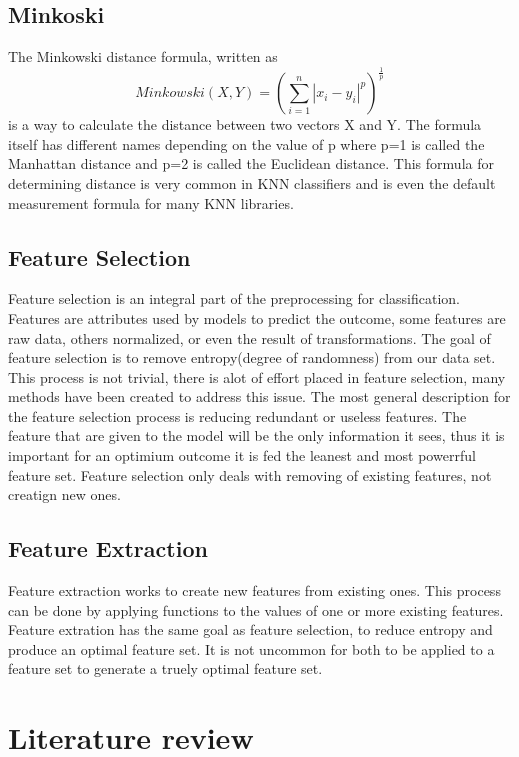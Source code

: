 \documentclass[confrence]{IEEEtran}
\begin{document}
\subsection*{Minkoski}
The Minkowski distance formula, written as \[ Minkowski(X,Y) = (\sum_{i=1}^n|x_i-y_i|^p)^\frac{1}{p}\] is a way to calculate the distance between two vectors X and Y. 
The formula itself has different names depending on the value of p where p=1 is called the Manhattan distance and p=2 is called the Euclidean distance. 
This formula for determining distance is very common in KNN classifiers and is even the default measurement formula for many KNN libraries. 
\subsection*{Feature Selection}
Feature selection is an integral part of the preprocessing for classification. 
Features are attributes used by models to predict the outcome, some features are raw data, others normalized, or even the result of transformations.
The goal of feature selection is to remove entropy(degree of randomness) from our data set.
This process is not trivial, there is alot of effort placed in feature selection, many methods have been created to address this issue.
The most general description for the feature selection process is reducing redundant or useless features.
The feature that are given to the model will be the only information it sees, thus it is important for an optimium outcome it is fed the leanest and most powerrful feature set.
Feature selection only deals with removing of existing features, not creatign new ones.
\subsection*{Feature Extraction}
Feature extraction works to create new features from existing ones.
This process can be done by applying functions to the values of one or more existing features.
Feature extration has the same goal as feature selection, to reduce entropy and produce an optimal feature set.
It is not uncommon for both to be applied to a feature set to generate a truely optimal feature set.
\section*{Literature review}
\end{document}
